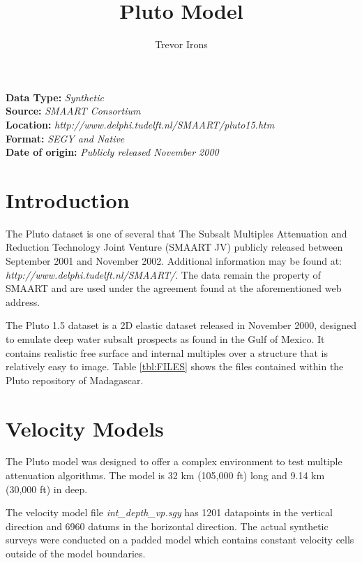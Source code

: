 \title{Pluto Model}
\author{Trevor Irons}
\shortpaper
\maketitle
\lstset{language=python,numbers=left,numberstyle=\tiny,showstringspaces=false}

\textbf {Data Type:} \emph{Synthetic}\\
\textbf {Source:} \emph{SMAART Consortium}\\
\textbf {Location:} \emph{http://www.delphi.tudelft.nl/SMAART/pluto15.htm}\\
\textbf {Format:} \emph{SEGY and Native} \\
\textbf{Date of origin:} \emph{Publicly released November 2000}\\

\section{Introduction} 
The Pluto dataset is one of several that The Subsalt Multiples Attenuation and Reduction Technology Joint Venture (SMAART JV) 
publicly released between September 2001 and November 2002.  Additional information may be found at:
\\ \emph{http://www.delphi.tudelft.nl/SMAART/}.  The data remain the property of SMAART and are used under the agreement found 
at the aforementioned web address.

The Pluto 1.5 dataset is a 2D elastic dataset released in November 2000, designed to emulate deep water subsalt prospects as 
found in the Gulf of Mexico. It contains realistic free surface and internal multiples over a structure that is relatively 
easy to image. Table \ref{tbl:FILES} shows the files contained within the Pluto repository of Madagascar.  
 
{
\tiny

\normalsize
}

\section{Velocity Models}
The Pluto model was designed to offer a complex environment to test multiple attenuation algorithms.  The model is 32 km 
(105,000 ft) long and 9.14 km (30,000 ft) in deep.  

The velocity model file \textit{int\_depth\_vp.sgy} has 1201 datapoints in the vertical direction and 6960 datums in 
the horizontal direction. The actual synthetic surveys were conducted on a padded model which contains constant velocity 
cells outside of the model boundaries.   

